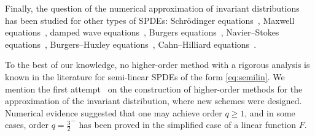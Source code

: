 \documentclass[11pt]{amsart}
\begin{document}
Finally, the question of the numerical approximation of invariant distributions has been studied for other types of SPDEs: Schr\"odinger equations~\cite{Chen-Hong-Wang:17,Hong-Wang:19,Hong-Wang-Zhang:17}, Maxwell equations~\cite{Chen-Hong-Ji-Liang:25,Chen-Hong-Liang}, damped wave equations~\cite{Lei-Brehier-Gan:25,Cai-Chen-Hong-Zhou}, Burgers equations~\cite{Boyaval-Martel-Reygner:22}, Navier--Stokes equations~\cite{GlattHoltz-Mondaini:25,Wu-Wang-Huang:23}, Burgers--Huxley equations~\cite{Wang-Wu-Huand-Zheng:25,Wang-Zhang-Cao:25}, Cahn--Hilliard equations~\cite{Deng-Wang-Cao}.


To the best of our knowledge, no higher-order method with a rigorous analysis is known in the literature for semi-linear SPDEs of the form \eqref{eq:semilin}. We mention the first attempt~\cite{Brehier_Vilmart:16} on the construction of higher-order methods for the approximation of the invariant distribution, where new schemes were designed. Numerical evidence suggested that one may achieve order $q\ge 1$, and in some cases, order $q=\frac32^-$ has been proved in the simplified case of a linear function $F$.
\end{document}
